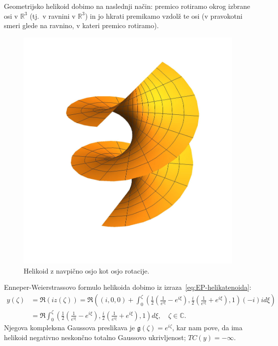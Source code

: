 \documentclass[12pt,a4paper,twoside]{article}
\theoremstyle{definition} %
\theoremstyle{plain} %
\numberwithin{equation}{section}  %
\begin{document}
Geometrijsko helikoid dobimo na naslednji način: premico rotiramo okrog izbrane osi v $\mathbb{R}^3$ (tj.~v ravnini v $\mathbb{R}^3$) in jo hkrati premikamo vzdolž te osi (v pravokotni smeri glede na ravnino, v kateri premico rotiramo).

\begin{figure}[h!]
\begin{center}
\includegraphics[scale=0.8]{images/helikoid.jpg}
\caption{Helikoid z navpično osjo kot osjo rotacije.}
\end{center}
\end{figure}

Enneper-Weierstrassovo formulo helikoida dobimo iz izraza~\eqref{eq:EP-helikatenoida}:
\begin{align}
y(\zeta) &= \Re (iz(\zeta)) = \Re \left( (i,0,0) + \int_{0}^{\zeta} \left( \frac{1}{2} \left(\frac{1}{e^{i\xi}} - e^{i\xi} \right), \frac{i}{2} \left(\frac{1}{e^{i\xi}} + e^{i\xi} \right), 1 \right) (-i) i d\xi \right) \nonumber \\
	&= \Re \int_{0}^{\zeta} \left( \frac{1}{2} \left(\frac{1}{e^{i\xi}} - e^{i\xi} \right), \frac{i}{2} \left(\frac{1}{e^{i\xi}} + e^{i\xi} \right), 1 \right) d\xi, \quad \zeta \in \mathbb{C}.
\end{align}
Njegova kompleksna Gaussova preslikava je $\mathfrak{g}(\zeta) = e^{i\zeta}$, kar nam pove, da ima helikoid negativno neskončno totalno Gaussovo ukrivljenost; $TC(y) = -\infty$. 
\end{document}
